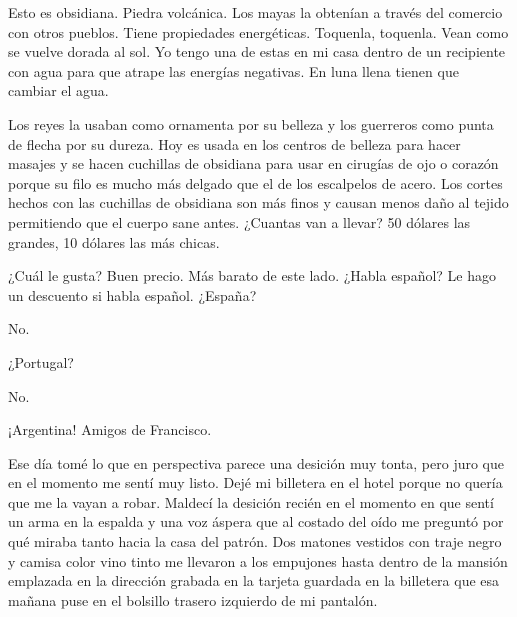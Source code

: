 \documentclass[11pt,twoside,openright,a6paper]{book}
\begin{document}
\vspace{0.5cm}
\hrulefill\hspace{0.2cm} \decofourleft\decofourright \hspace{0.2cm} \hrulefill
\vspace{0.5cm}

Esto es obsidiana. Piedra volcánica. Los mayas la obtenían a través
del comercio con otros pueblos. Tiene propiedades energéticas. Toquenla,
toquenla. Vean como se vuelve dorada al sol. Yo tengo una de estas en
mi casa dentro de un recipiente con agua para que atrape las energías
negativas. En luna llena tienen que cambiar el agua.

Los reyes la usaban como ornamenta por su belleza y los guerreros como punta
de flecha por su dureza. Hoy es usada en los centros de belleza para hacer
masajes y se hacen cuchillas de obsidiana para usar en cirugías de ojo o
corazón porque su filo es mucho más delgado que el de los escalpelos de
acero. Los cortes hechos con las cuchillas de obsidiana son más finos y
causan menos daño al tejido permitiendo que el cuerpo sane antes. ¿Cuantas
van a llevar? 50 dólares las grandes, 10 dólares las más chicas.


\vspace{0.5cm}
\hrulefill\hspace{0.2cm} \decofourleft\decofourright \hspace{0.2cm} \hrulefill
\vspace{0.5cm}

¿Cuál le gusta? Buen precio. Más barato de este lado. ¿Habla español? Le
hago un descuento si habla español. ¿España?

No.

¿Portugal?

No.

¡Argentina! Amigos de Francisco.


\vspace{0.5cm}
\hrulefill\hspace{0.2cm} \decofourleft\decofourright \hspace{0.2cm} \hrulefill
\vspace{0.5cm}

Ese día tomé lo que en perspectiva parece una desición muy tonta, pero
juro que en el momento me sentí muy listo. Dejé mi billetera en el hotel
porque no quería que me la vayan a robar. Maldecí la desición recién
en el momento en que sentí un arma en la espalda y una voz áspera que
al costado del oído me preguntó por qué miraba tanto hacia la casa del
patrón. Dos matones vestidos con traje negro y camisa color vino tinto
me llevaron a los empujones hasta dentro de la mansión emplazada en la
dirección grabada en la tarjeta guardada en la billetera que esa mañana
puse en el bolsillo trasero izquierdo de mi pantalón.
\end{document}

